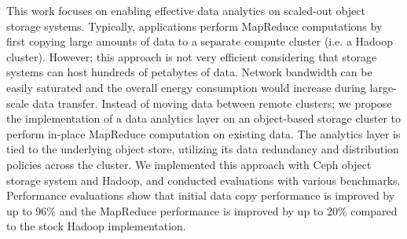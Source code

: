 This work focuses on enabling effective data analytics on scaled-out
object storage systems. Typically, applications perform MapReduce
computations by first copying large amounts of data to a separate compute
cluster (i.e. a Hadoop cluster). However; this approach is not very efficient
considering that storage systems can host hundreds of
petabytes of data. Network bandwidth can be easily saturated and the
overall energy consumption would increase during large-scale data
transfer. Instead of moving data between remote clusters; we
propose the implementation of a data analytics layer
on an object-based storage cluster to perform in-place MapReduce
computation on existing data. The analytics layer is tied to the underlying
object store, utilizing its data redundancy and distribution policies across
the cluster. We implemented this approach with Ceph object storage system and
Hadoop, and conducted evaluations with various benchmarks. Performance evaluations
show that initial data copy performance is improved by up to 96\% and
the MapReduce performance is improved by up to 20\% compared to the stock Hadoop
implementation.
